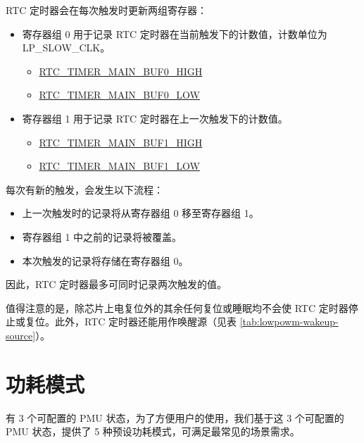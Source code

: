 \documentclass[main\_\_CN.tex]{subfiles}
\begin{document}
RTC 定时器会在每次触发时更新两组寄存器：
\begin{itemize}
    \item 寄存器组 0 用于记录 RTC 定时器在当前触发下的计数值，计数单位为 LP\_SLOW\_CLK。
    \begin{itemize}
        \item \hyperref[fielddesc:RTCTIMERMAINBUF0HIGH]{RTC\_TIMER\_MAIN\_BUF0\_HIGH}
        \item \hyperref[fielddesc:RTCTIMERMAINBUF0LOW]{RTC\_TIMER\_MAIN\_BUF0\_LOW}
    \end{itemize}
    \item 寄存器组 1 用于记录 RTC 定时器在上一次触发下的计数值。
    \begin{itemize}
    \item \hyperref[fielddesc:RTCTIMERMAINBUF1HIGH]{RTC\_TIMER\_MAIN\_BUF1\_HIGH}
    \item \hyperref[fielddesc:RTCTIMERMAINBUF1LOW]{RTC\_TIMER\_MAIN\_BUF1\_LOW}
    \end{itemize}
\end{itemize}

每次有新的触发，会发生以下流程：
\begin{itemize}
    \item 上一次触发时的记录将从寄存器组 0 移至寄存器组 1。
    \item 寄存器组 1 中之前的记录将被覆盖。
    \item 本次触发的记录将存储在寄存器组 0。
\end{itemize}

因此，RTC 定时器最多可同时记录两次触发的值。

值得注意的是，除芯片上电复位外的其余任何复位或睡眠均不会使 RTC 定时器停止或复位。此外，RTC 定时器还能用作唤醒源（见表 \ref{tab:lowpowm-wakeup-source}）。

\section{功耗模式}\label{sec:lowpowm-predefined-power-modes}

\chipname{} 有 3 个可配置的 PMU 状态，为了方便用户的使用，我们基于这 3 个可配置的 PMU 状态，提供了 5 种预设功耗模式，可满足最常见的场景需求。
\end{document}
